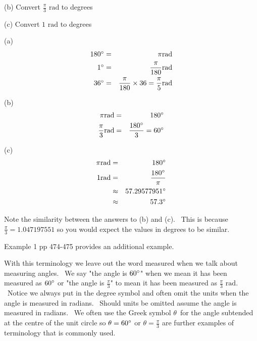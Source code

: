 (b) Convert $\frac{\pi }{3}$ $\mbox{rad}$ to degrees 

(c) Convert $1$ $\mbox{rad}$ to degrees 

(a)
\begin{align*}180 \mbox{{\ensuremath{{}^\circ}}} &  = & \pi \text{}\mbox{rad} \\
1 \mbox{{\ensuremath{{}^\circ}}} &  = & \frac{\pi }{180}\text{}\mbox{rad} \\
36 \mbox{{\ensuremath{{}^\circ}}} &  = & \frac{\pi }{180} \times 36 =\frac{\pi }{5}\text{}\mbox{rad}\end{align*}

(b)
\begin{align*}\pi  \mbox{rad} &  = & 180 \mbox{{\ensuremath{{}^\circ}}} \\
\frac{\pi }{3} \mbox{rad} &  = & \frac{180 \mbox{{\ensuremath{{}^\circ}}}}{3} =60 \mbox{{\ensuremath{{}^\circ}}}\end{align*}

(c)
\begin{align*}\pi  \mbox{rad} &  = & 180 \mbox{{\ensuremath{{}^\circ}}} \\
1 \mbox{rad} &  = & \frac{180 \mbox{{\ensuremath{{}^\circ}}}}{\pi } \\
 &  \approx  & 57.29577951 \mbox{{\ensuremath{{}^\circ}}} \\
 &  \approx  & 57.3 \mbox{{\ensuremath{{}^\circ}}}\end{align*}

Note the similarity between the answers to (b) and (c). \ This
is because $\frac{\pi }{3} =1.047197551$ so you would expect the values in degrees to be similar. 

Example 1 pp 474-475 provides an additional
example. 

With this terminology we leave out the word measured when we talk about measuring angles. \ We
say "the angle is $60 \mbox{{\ensuremath{{}^\circ}}}$" when we mean it has been measured as $60 \mbox{{\ensuremath{{}^\circ}}}$ or "the angle is $\frac{\pi }{3}$" to mean it has been measured as $\frac{\pi }{3}$ $\mbox{rad}$. \ Notice we always put in the degree symbol and
often omit the units when the angle is measured in radians. \ Should units be omitted assume the angle is measured
in radians. \ We often use the Greek symbol $\theta $\ for the angle subtended at the centre of the unit circle so $\theta  =60 \mbox{{\ensuremath{{}^\circ}}}$ or $\theta  =\frac{\pi }{3}$ are further examples of terminology that is commonly used.

